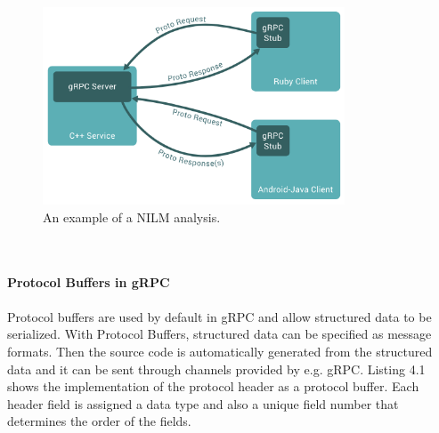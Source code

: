 \begin{figure}[tbp]
  \centering
  \includegraphics[width=0.8\textwidth]{images/grpc.png}
  \caption[Short description]{An example of a NILM analysis.}
  \label{fig:Appliance_Model}
\end{figure}\\
\\
\textbf{Protocol Buffers in gRPC}
\\
\\
Protocol buffers are used by default in gRPC and allow structured data to be serialized. With Protocol Buffers, structured data can be specified as message formats. Then the source code is automatically generated from the structured data and it can be sent through channels provided by e.g. gRPC.
Listing 4.1 shows the implementation of the protocol header as a protocol buffer. Each header field is assigned a data type and also a unique field number that determines the order of the fields.\\

